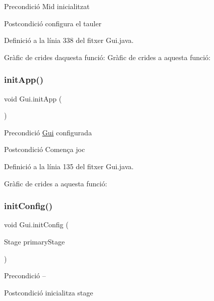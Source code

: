 \begin{DoxyPrecond}{Precondició}
Mid inicialitzat 
\end{DoxyPrecond}
\begin{DoxyPostcond}{Postcondició}
configura el tauler 
\end{DoxyPostcond}


Definició a la línia 338 del fitxer Gui.\+java.

Gràfic de crides d\textquotesingle{}aquesta funció\+:
Gràfic de crides a aquesta funció\+:
\mbox{\label{class_gui_a419d7993c3c961fd4e102ec5644b5bd6}} 
\subsubsection{\texorpdfstring{init\+App()}{initApp()}}
{\footnotesize\ttfamily void Gui.\+init\+App (\begin{DoxyParamCaption}{ }\end{DoxyParamCaption})\hspace{0.3cm}{\ttfamily [private]}}

\begin{DoxyPrecond}{Precondició}
\mbox{\hyperlink{class_gui}{Gui}} configurada 
\end{DoxyPrecond}
\begin{DoxyPostcond}{Postcondició}
Comença joc 
\end{DoxyPostcond}


Definició a la línia 135 del fitxer Gui.\+java.

Gràfic de crides a aquesta funció\+:
\mbox{\label{class_gui_ad63939d05f3eea6931bcc16234afe330}} 
\subsubsection{\texorpdfstring{init\+Config()}{initConfig()}}
{\footnotesize\ttfamily void Gui.\+init\+Config (\begin{DoxyParamCaption}\item[{Stage}]{primary\+Stage }\end{DoxyParamCaption})\hspace{0.3cm}{\ttfamily [private]}}

\begin{DoxyPrecond}{Precondició}
-- 
\end{DoxyPrecond}
\begin{DoxyPostcond}{Postcondició}
inicialitza stage 
\end{DoxyPostcond}


